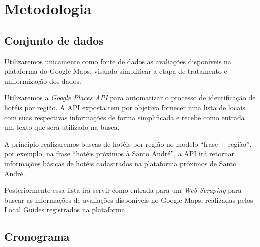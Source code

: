 \chapter{Metodologia}
\label{cap:metodologia}

\section{Conjunto de dados}

Utilizaremos unicamente como fonte de dados as avaliações disponíveis na plataforma do Google Maps, visando simplificar a etapa de tratamento e uniformização dos dados.

Utilizaremos a \emph{Google Places API} para automatizar o processo de identificação de hotéis por região. A API exposta tem por objetivo fornecer uma lista de locais com suas respectivas informações de forma simplificada e recebe como entrada um texto que será utilizado na busca.

A princípio realizaremos buscas de hotéis por região no modelo “frase + região”, por exemplo, na frase “hotéis próximos à Santo André”, a API irá retornar informações básicas de hotéis cadastrados na plataforma próximos de Santo André.

Posteriormente essa lista irá servir como entrada para um \emph{Web Scraping} para buscar as informações de avaliações disponíveis no Google Maps, realizadas pelos Local Guides\cite{google2022localguides} registrados na plataforma.

\section{Cronograma}
